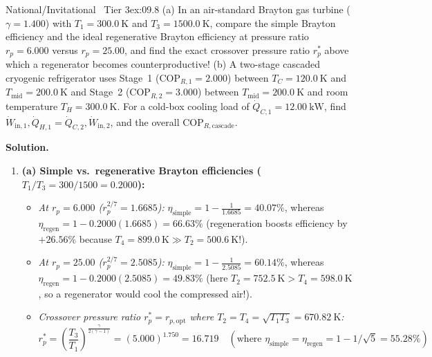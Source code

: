 \begin{workedexample}{National/Invitational \textbar\ Tier 3}{ex:09.8}
(a) In an air-standard Brayton gas turbine ($\gamma = 1.400$) with $T_1 = \SI{300.0}{\kelvin}$ and $T_3 = \SI{1500.0}{\kelvin}$, compare the simple Brayton efficiency  and the ideal regenerative Brayton efficiency  at pressure ratio $r_p = 6.000$ versus $r_p = 25.00$, and find the exact crossover pressure ratio $r_p^*$ above which a regenerator becomes counterproductive!
(b) A two-stage cascaded cryogenic refrigerator uses Stage~1 ($\mathrm{COP}_{R,1} = 2.000$) between $T_C = \SI{120.0}{\kelvin}$ and $T_{\mathrm{mid}} = \SI{200.0}{\kelvin}$ and Stage~2 ($\mathrm{COP}_{R,2} = 3.000$) between $T_{\mathrm{mid}} = \SI{200.0}{\kelvin}$ and room temperature $T_H = \SI{300.0}{\kelvin}$. For a cold-box cooling load of $\dot{Q}_{C,1} = \SI{12.00}{\kilo\watt}$, find $\dot{W}_{\mathrm{in},1}, \dot{Q}_{H,1} = \dot{Q}_{C,2}, \dot{W}_{\mathrm{in},2}$, and the overall $\mathrm{COP}_{R,\mathrm{cascade}}$.
\par\smallskip\noindent
\textbf{Solution.}
\begin{enumerate}
  \item \textbf{(a) Simple vs.\ regenerative Brayton efficiencies ($T_1/T_3 = 300/1500 = 0.2000$):}
  \begin{itemize}
    \item \emph{At $r_p = 6.000$ ($r_p^{2/7} = 1.6685$):} $\eta_{\mathrm{simple}} = 1 - \frac{1}{1.6685} = \mathbf{40.07\%}$, whereas $\eta_{\mathrm{regen}} = 1 - 0.2000(1.6685) = \mathbf{66.63\%}$ (regeneration boosts efficiency by $+26.56\%$ because $T_4 = \SI{899.0}{\kelvin} \gg T_2 = \SI{500.6}{\kelvin}$!).
    \item \emph{At $r_p = 25.00$ ($r_p^{2/7} = 2.5085$):} $\eta_{\mathrm{simple}} = 1 - \frac{1}{2.5085} = \mathbf{60.14\%}$, whereas $\eta_{\mathrm{regen}} = 1 - 0.2000(2.5085) = \mathbf{49.83\%}$ (here $T_2 = \SI{752.5}{\kelvin} > T_4 = \SI{598.0}{\kelvin}$, so a regenerator would cool the compressed air!).
    \item \emph{Crossover pressure ratio $r_p^* = r_{p,\mathrm{opt}}$ where $T_2 = T_4 = \sqrt{T_1 T_3} = \SI{670.82}{\kelvin}$:}
    \[
      r_p^* = \left(\frac{T_3}{T_1}\right)^{\frac{\gamma}{2(\gamma - 1)}} = (5.000)^{1.750} = \mathbf{16.719} \quad (\text{where } \eta_{\mathrm{simple}} = \eta_{\mathrm{regen}} = 1 - 1/\sqrt{5} = \mathbf{55.28\%})
    \]
  \end{itemize}

\end{enumerate}
\end{workedexample}
